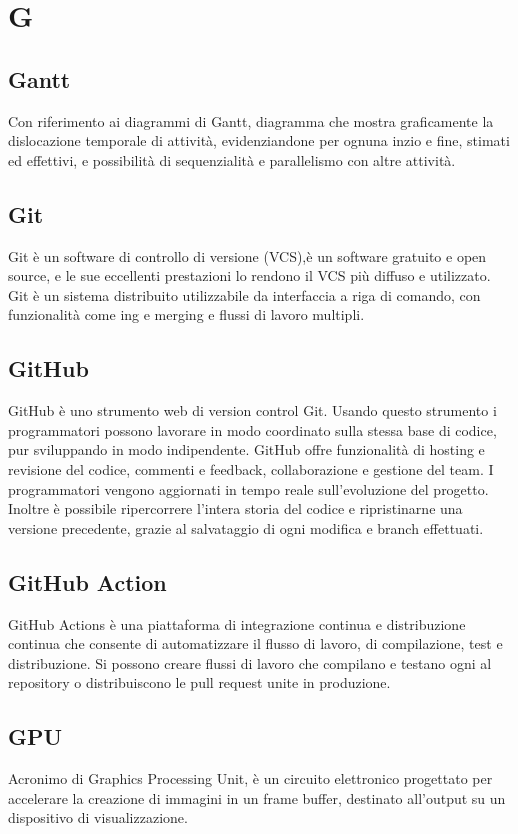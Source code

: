 \chapter{G}

\section{Gantt}
Con riferimento ai diagrammi di Gantt, diagramma che mostra graficamente la dislocazione temporale di attività, evidenziandone per ognuna inzio e fine, stimati ed effettivi, e possibilità di sequenzialità e parallelismo con altre attività.

\section{Git}
Git è un software di controllo di versione (VCS),è un software gratuito e open source, e le sue eccellenti prestazioni lo rendono il VCS più diffuso e utilizzato.
Git è un sistema distribuito utilizzabile da interfaccia a riga di comando, con funzionalità come ing e merging e flussi di lavoro multipli.

\section{GitHub}
GitHub è uno strumento web di version control Git. Usando questo strumento i programmatori possono lavorare in modo coordinato sulla stessa base di codice, pur sviluppando in modo indipendente.
GitHub offre funzionalità di hosting e revisione del codice, commenti e feedback, collaborazione e gestione del team. I programmatori vengono aggiornati in tempo reale sull'evoluzione del progetto. Inoltre è possibile ripercorrere l'intera storia del codice e ripristinarne una versione precedente, grazie al salvataggio di ogni modifica e branch effettuati.

\section{GitHub Action}\label{sec:GitHub Actions}
GitHub Actions è una piattaforma di integrazione continua e distribuzione continua che consente di automatizzare il flusso di lavoro, di compilazione, test e distribuzione. Si possono creare flussi di lavoro che compilano e testano ogni  al repository o distribuiscono le pull request unite in produzione.

\section{GPU}
Acronimo di Graphics  Processing Unit, è un circuito elettronico progettato per accelerare la creazione di immagini in un frame buffer, destinato all'output su un dispositivo di visualizzazione.